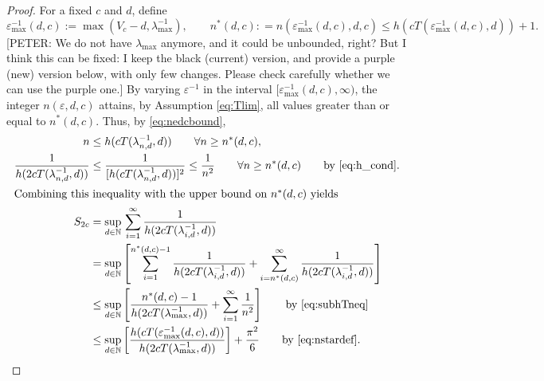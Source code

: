 \documentclass[sort&compress]{elsarticle}
\newcommand{\peter}[1]{\begingroup\color{violet}#1\endgroup}
\begin{document}
\begin{proof}
For a fixed $c$ and $d$, define
\begin{equation} \label{eq:nstardef}
	\varepsilon^{-1}_{\max}(d,c) := \max(V_c - d,\lambda_{\max}^{-1}), \qquad n^*(d,c) : = n(\varepsilon^{-1}_{\max}(d,c),d,c) \le h(cT(\varepsilon^{-1}_{\max}(d,c),d)) +1.
\end{equation}
\peter{[PETER: We do not have $\lambda_{\max}$ anymore, and it could be unbounded, right? But I think this can be fixed: I keep the black (current) version, and provide a purple (new) version below, with only few changes. Please check carefully whether we can use the purple one.]}
By varying $\varepsilon^{-1}$ in the interval $[\varepsilon^{-1}_{\max}(d,c),\infty)$,  the integer $n(\varepsilon,d,c)$ attains, \peter{by Assumption \eqref{eq:Tlim},} all values greater than or equal to $n^*(d,c)$.  Thus, by \eqref{eq:nedcbound},
\begin{align}
		n &\le h(cT(\lambda^{-1}_{n,d},d)) \qquad  \forall n \ge n^*(d,c), \label{eq:subhTneq}\\
		\nonumber
		\frac{1}{h(2 cT(\lambda^{-1}_{n,d},d)) } & \le \frac{1}{[h(cT(\lambda^{-1}_{n,d},d))]^{2}}  \le \frac 1{n^2}   \qquad  \forall n \ge n^*(d,c) \qquad \text{by \eqref{eq:h_cond}}. \\
		\intertext{Combining this inequality with the upper bound on $n^*(d,c)$ yields}
		\nonumber
		S_{2c} & =\sup_{d\in\mathbb{N}}  \, \sum_{i=1}^\infty \frac1{h(2cT(\lambda_{i,d}^{-1},d))} \\
		\nonumber
		&  = \sup_{d\in\mathbb{N}} \left [
		\sum_{i=1}^{n^*(d,c)-1} \frac1{h(2cT(\lambda_{i,d}^{-1},d))}
		+ \sum_{i=n^*(d,c)}^\infty \frac1{h(2cT(\lambda_{i,d}^{-1},d))}
		\right]\\
		 \nonumber
		 & \le \sup_{d\in\mathbb{N}} \left [
\frac{n^*(d,c)-1}{h(2cT(\lambda_{\max}^{-1},d))}
+ \sum_{i=1}^\infty \frac1{n^2}
\right]
 \qquad \text{by \eqref{eq:subhTneq}}\\
 \label{eq:lastone}
		 & \le \sup_{d\in\mathbb{N}} \left [
		 \frac{ h(cT(\varepsilon^{-1}_{\max}(d,c),d))}{h(2cT(\lambda_{\max}^{-1},d))}
		\right] + \frac{\pi^2}{6}
		\qquad \text{by \eqref{eq:nstardef}.}
\end{align}


\end{proof}
\end{document}
